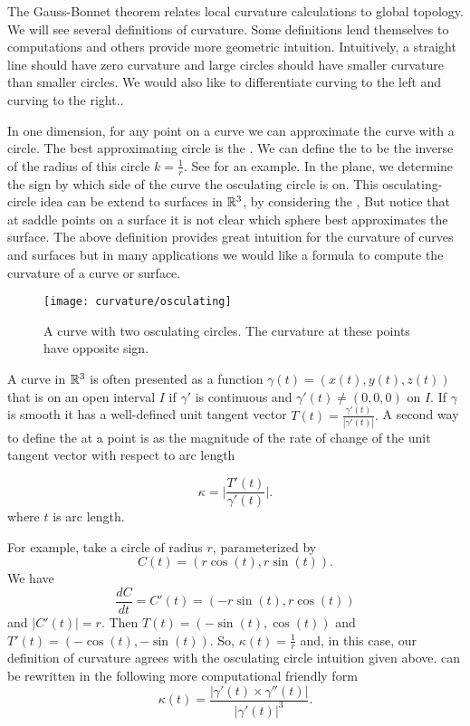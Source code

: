 
The Gauss-Bonnet theorem relates local curvature calculations
to global topology. 
We will see several definitions of curvature.
Some definitions lend themselves to computations and others provide
more geometric intuition.
Intuitively, a straight line should have zero curvature and
 large circles should have smaller curvature than smaller circles.
 We would also like to differentiate
curving to the left and curving to the right..

In one dimension, for any point on a curve
we can approximate the curve with a circle.
The best approximating circle is the  .
 We can define the  to be the inverse of the radius of this circle $k=\frac{1}{r}$.
See  for an example.
In the plane, we determine the sign by which side of the curve the osculating circle is on.
 This osculating-circle idea can be extend
to  surfaces in $\mathbb{R}^3$, by considering the ,
But notice that at saddle points on a surface it is not clear which sphere
best approximates the surface.
The above definition provides great intuition for the curvature of curves
and surfaces but in many applications we would like a formula to compute
the curvature of a curve or surface.


\begin{figure}[htb]
	\centering
	\texttt{[image: curvature/osculating]}
	\caption{A curve with two osculating circles. The curvature at these points
	have opposite sign.}
	\label{fig:osculating-circle}
\end{figure}

A curve in $\mathbb{R}^3$ is often presented as a function
$\gamma(t)=(x(t),y(t),z(t))$ that  is  on an open interval $I$
if $\gamma'$ is continuous and $\gamma'(t)\neq (0,0,0)$ on $I$. 
If $\gamma$ is smooth it has a well-defined unit tangent vector $T(t)=\frac{\gamma'(t)}{|\gamma'(t)|}.$
A second way to define the   at a point is as the magnitude of the rate of change of the unit tangent vector with respect to arc length

\begin{equation} \label{eqn:kappa}
\kappa=\bigg  | \frac{T'(t)}{\gamma'(t)}\bigg |.
\end{equation}
where $t$ is arc length.

For example, take a circle of radius $r$, parameterized by 
$$C(t)=\left(r\cos(t),r\sin(t)\right).$$
We have 
$$\frac{dC}{dt}=C'(t)=\left(-r\sin(t),r\cos(t)\right)$$ and $|C'(t)|=r.$
Then $T(t)=\left(-\sin(t),\cos(t)\right)$ and $T'(t)=\left(-\cos(t),-\sin(t)\right)$.
So, $\kappa(t)=\frac{1}{r}$ and, in this case, our definition of curvature agrees with the
osculating circle intuition given above. 
 can be rewritten in the following more computational friendly form 
\begin{equation} \label{eqn:kappa1}
\kappa(t)=\frac{|\gamma'(t)\times \gamma''(t)|}{|\gamma'(t)|^3}.
\end{equation}

